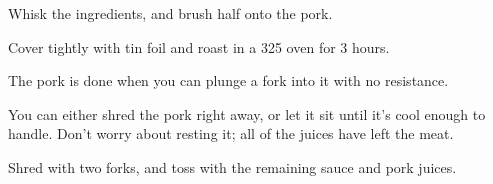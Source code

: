 \begin{recipe}
Whisk the ingredients, and brush half onto the pork.

Cover tightly with tin foil and roast in a 325\degree{} oven for 3 hours.

The pork is done when you can plunge a fork into it with no resistance.

You can either shred the pork right away, or let it sit until it's cool enough to handle. Don't worry about resting it; all of the juices have left the meat.

Shred with two forks, and toss with the remaining sauce and pork juices.

\end{recipe}
